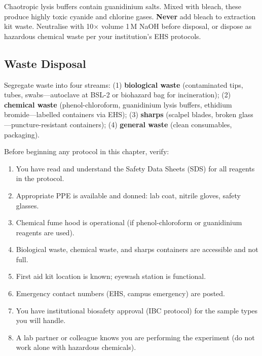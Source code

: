 \begin{warningbox}[title={Never Mix Guanidinium Salts with Bleach}]
Chaotropic lysis buffers contain guanidinium salts. Mixed with bleach, these produce highly toxic cyanide and chlorine gases. \textbf{Never} add bleach to extraction kit waste. Neutralise with 10$\times$ volume 1\,M NaOH before disposal, or dispose as hazardous chemical waste per your institution's EHS protocols.
\end{warningbox}

\subsection{Waste Disposal}
\label{subsec:protocols:waste}

Segregate waste into four streams: (1) \textbf{biological waste} (contaminated tips, tubes, swabs---autoclave at BSL-2 or biohazard bag for incineration); (2) \textbf{chemical waste} (phenol-chloroform, guanidinium lysis buffers, ethidium bromide---labelled containers via EHS); (3) \textbf{sharps} (scalpel blades, broken glass---puncture-resistant containers); (4) \textbf{general waste} (clean consumables, packaging).

\begin{protocolbox}[title={Pre-Experiment Safety Checklist}]
Before beginning any protocol in this chapter, verify:
\begin{enumerate}[nosep]
  \item[$\square$] You have read and understand the Safety Data Sheets (SDS) for all reagents in the protocol.
  \item[$\square$] Appropriate PPE is available and donned: lab coat, nitrile gloves, safety glasses.
  \item[$\square$] Chemical fume hood is operational (if phenol-chloroform or guanidinium reagents are used).
  \item[$\square$] Biological waste, chemical waste, and sharps containers are accessible and not full.
  \item[$\square$] First aid kit location is known; eyewash station is functional.
  \item[$\square$] Emergency contact numbers (EHS, campus emergency) are posted.
  \item[$\square$] You have institutional biosafety approval (IBC protocol) for the sample types you will handle.
  \item[$\square$] A lab partner or colleague knows you are performing the experiment (do not work alone with hazardous chemicals).
\end{enumerate}
\end{protocolbox}

